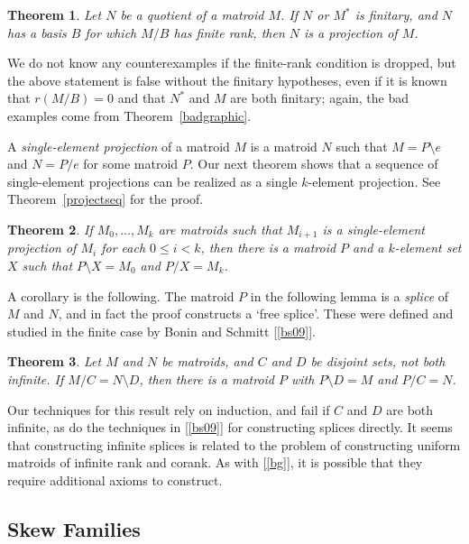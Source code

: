 \documentclass{amsart}
\theoremstyle{plain}
\newtheorem{theorem}{Theorem}[section]
\theoremstyle{definition}
\newcommand{\del}{\!\setminus\!}
\newcommand{\con}{/}
\renewcommand{\le}{\leqslant}
\begin{document}
\begin{theorem}\label{quotientisprojectintro}
  Let $N$ be a quotient of a matroid $M$. If $N$ or $M^*$ is finitary, 
  and $N$ has a basis $B$ for which $M \con B$ has finite rank, then $N$ is a projection of $M$. 
\end{theorem}

We do not know any counterexamples if the finite-rank condition is dropped, 
but the above statement is false without the finitary hypotheses, 
even if it is known that $r(M \con B) = 0$ and that $N^*$ and $M$ are both finitary; 
again, the bad examples come from Theorem~\ref{badgraphic}. 

A \emph{single-element projection} of a matroid $M$ is a matroid $N$ such that
$M = P \del e$ and $N = P \con e$ for some matroid $P$. Our next theorem shows 
that a sequence of single-element projections can be realized as a single $k$-element 
projection. See Theorem~\ref{projectseq} for the proof. 

\begin{theorem}\label{bigprojofseq}
  If $M_0, \dotsc, M_k$ are matroids such that $M_{i+1}$ is a single-element 
  projection of $M_i$ for each $0 \le i < k$, then there is a matroid $P$
  and a $k$-element set $X$ such that $P \del X = M_0$ and $P \con X = M_k$. 
\end{theorem}

A corollary is the following. The matroid $P$ in the following lemma is a \emph{splice}
of $M$ and $N$, and in fact the proof constructs a `free splice'. 
These were defined and studied in the finite case by Bonin and Schmitt [\ref{bs09}]. 

\begin{theorem}\label{splice}
  Let $M$ and $N$ be matroids, and $C$ and $D$ be disjoint sets, not both infinite. If $M \con C = N \del D$,
  then there is a matroid $P$ with $P \del D = M$ and $P \con C = N$. 
\end{theorem}

Our techniques for this result rely on induction, and fail if $C$ and $D$
are both infinite, as do the techniques in [\ref{bs09}] for constructing splices
directly. It seems that constructing infinite splices is related to the problem
of constructing uniform matroids of infinite rank and corank. 
As with [\ref{bg}], it is possible that they require additional axioms
to construct. 

\subsection*{Skew Families}
\end{document}
